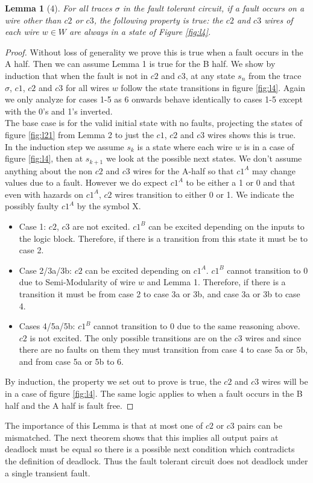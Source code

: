 \documentclass[12pt]{report}
\newtheorem*{lemma}{Lemma}
\begin{document}
\begin{lemma}[4]
For all traces $\sigma$ in the fault tolerant circuit, if a fault occurs on a wire other than $c2$ or $c3$, the following property is true: the $c2$ and $c3$ wires of each wire $w\in W$ are always in a state of Figure \ref{fig:l4}.
\end{lemma}
\begin{proof}
Without loss of generality we prove this is true when a fault occurs in the A half.  Then we can assume Lemma 1 is true for the B half.  We show by induction that when the fault is not in $c2$ and $c3$, at any state $s_n$ from the trace $\sigma$, $c1$, $c2$ and $c3$ for all wires $w$ follow the state transitions in figure \ref{fig:l4}.  Again we only analyze for cases 1-5 as 6 onwards behave identically to cases 1-5 except with the 0's and 1's inverted.\\

The base case is for the valid initial state with no faults, projecting the states of figure \ref{fig:l21} from Lemma 2 to just the $c1$, $c2$ and $c3$ wires shows this is true. \\

In the induction step we assume $s_k$ is a state where each wire $w$ is in a case of figure \ref{fig:l4}, then at $s_{k+1}$ we look at the possible next states.  We don't assume anything about the non $c2$ and $c3$ wires for the A-half so that $c1^A$ may change values due to a fault.  However we do expect $c1^A$ to be either a 1 or 0 and that even with hazards on $c1^A$, $c2$ wires transition to either 0 or 1.  We indicate the possibly faulty $c1^A$ by the symbol X.
\begin{itemize}
	\item
Case 1:  $c2$, $c3$ are not excited.  $c1^B$ can be excited depending on the inputs to the logic block.  Therefore, if there is a transition from this state it must be to case 2.
\item
Case 2/3a/3b:  $c2$ can be excited depending on $c1^A$.  $c1^B$ cannot transition to 0 due to Semi-Modularity of wire $w$ and Lemma 1.  Therefore, if there is a transition it must be from case 2 to case 3a or 3b, and case 3a or 3b to case 4.
\item
Cases 4/5a/5b:  $c1^B$ cannot transition to 0 due to the same reasoning above.  $c2$ is not excited. The only possible transitions are on the $c3$ wires and since there are no faults on them they must transition from case 4 to case 5a or 5b, and from case 5a or 5b to 6.
\end{itemize}
By induction, the property we set out to prove is true, the $c2$ and $c3$ wires will be in a case of figure \ref{fig:l4}. 
The same logic applies to when a fault occurs in the B half and the A half is fault free.  
\end{proof}
The importance of this Lemma is that at most one of $c2$ or $c3$ pairs can be mismatched.  The next theorem shows that this implies all output pairs at deadlock must be equal so there is a possible next condition which contradicts the definition of deadlock.  Thus the fault tolerant circuit does not deadlock under a single transient fault.
\end{document}
